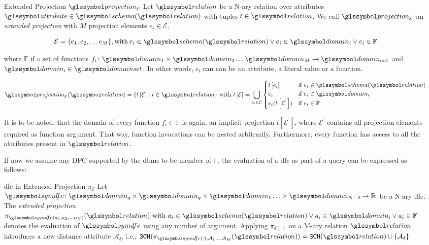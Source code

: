 \begin{definition}[label=definition:extended_projection]{Extended Projection $\projection_\mathcal{E}$}{}
Let $\relation$ be a N-ary relation over attributes $\attribute \in \schema (\relation)$ with tuples $t \in \relation$. We call $\projection_\mathcal{E}$ an \emph{extended projection} with $M$ projection elements $e_i \in \mathcal{E}$,

\begin{equation*}
    \mathcal{E} = \{ e_1, e_2, \ldots e_M \}, \textrm{with} \: e_i \in \schema(\relation) \vee e_i \in \domain_i \vee e_i \in \mathbb{F}
\end{equation*}

where $\mathbb{F}$ if a set of functions $f_i \colon \domain_{1} \times \domain_{2} \ldots \domain_{M} \rightarrow \domain_{out}$ and $\domain_i \in \domainset$. In other words, $e_i$ can can be an attribute, a literal value or a function.

\begin{equation*}
    \projection_{\mathcal{E}}(\relation) =  \{ t\left[ \mathcal{E} \right] : t \in \relation \} \textrm{ with } t\left[ \mathcal{E} \right] = \bigcup_{e_i \in \mathcal{E}}
    \begin{cases} 
        t \left[ e_i \right] & \text{if } e_i \in \schema(\relation) \\
        e_i  & \text{if } e_i \in \domain_i \\
        e_i(t \left[ \mathcal{E}^{'} \right]) & \text{if } e_i \in \mathbb{F} \\
    \end{cases}
\end{equation*}

\end{definition}

It is to be noted, that the domain of every function $f_i \in \mathbb{F}$ is again, an implicit projection $t \left[ \mathcal{E}^{'}\right]$, where $\mathcal{E}^{'}$ contains all projection elements required as function argument. That way, function invocations can be nested arbitrarily. Furthermore, every function has access to all the attributes present in $\relation$.

If now we assume any DFC supported by the \acrshort{dbms} to be member of $\mathbb{F}$, the evaluation of a \acrshort{dfc} as part of a query can be expressed as follows:

\begin{definition}[label=definition:spf_rel]{\acrlong{dfc} in Extended Projection $\pi_{\mathcal{E}}$}{}
    Let $\symdfc \colon \domain_q \times \domain_q \times \domain_{1} \ldots \times \domain_{N-2} \to \mathbb{R}$ be a N-ary \acrshort{dfc}. The \emph{extended projection} $\pi_{\symdfc(a_1, a_2, \ldots a_N)}(\relation) \textrm { with } a_i \in \schema(\relation) \vee a_i \in \domain_i \vee a_i \in \mathbb{F}$ denotes the evaluation of $\symdfc$ using any number of argument. Applying $\pi_{\delta(\cdot)}$ on a M-ary relation $\relation$ introduces a new distance attribute $\mathcal{A}_\delta$, i.e., $\mathtt{SCH}(\pi_{\symdfc(\cdot), \mathcal{A}_1, \ldots \mathcal{A}_M}(\relation)) = \mathtt{SCH}(\relation) \cup \{ \mathcal{A}_\delta \}$
\end{definition}

